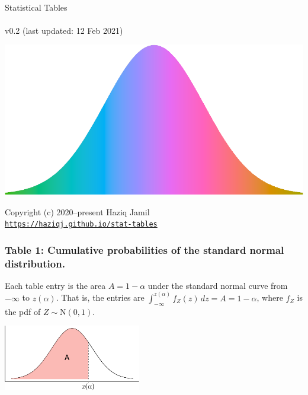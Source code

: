 \documentclass[
]{article}
\author{}
\date{\vspace{-2.5em}}
\begin{document}
\thispagestyle{empty}
\begin{center}
~\\
\vspace{2cm}
{\Huge Statistical Tables}
~\\~\\
v0.2 (last updated: 12 Feb 2021)
\vspace{5cm}
\end{center}

\begin{center}\includegraphics[width=\textwidth]{figure/unnamed-chunk-1-1} \end{center}

\vfill
\begin{center}
Copyright (c) 2020--present Haziq Jamil
~\\
\href{https://haziqj.github.io/stat-tables}{\texttt{https://haziqj.github.io/stat-tables}}
\end{center}

\newpage

\hypertarget{table-1-cumulative-probabilities-of-the-standard-normal-distribution.}{%
\subsubsection{Table 1: Cumulative probabilities of the standard normal
distribution.}\label{table-1-cumulative-probabilities-of-the-standard-normal-distribution.}}

Each table entry is the area \(A=1-\alpha\) under the standard normal
curve from \(-\infty\) to \(z(\alpha)\). That is, the entries are
\(\int_{-\infty}^{z(\alpha)}f_Z(z) \, dz = A = 1-\alpha\), where \(f_Z\)
is the pdf of \(Z\sim \text{N}(0,1)\).

\vspace{1em}

\begin{center}\includegraphics[width=6cm]{figure/unnamed-chunk-2-1} \end{center}
\end{document}
